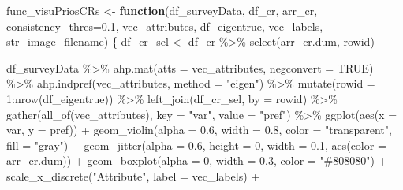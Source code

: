 \documentclass[
]{article}
\newenvironment{Shaded}{\begin{snugshade}}{\end{snugshade}}
\newcommand{\AttributeTok}[1]{\textcolor[rgb]{0.00,0.34,0.68}{#1}}
\newcommand{\ConstantTok}[1]{\textcolor[rgb]{0.67,0.33,0.00}{#1}}
\newcommand{\ControlFlowTok}[1]{\textcolor[rgb]{0.12,0.11,0.11}{\textbf{#1}}}
\newcommand{\DecValTok}[1]{\textcolor[rgb]{0.69,0.50,0.00}{#1}}
\newcommand{\FloatTok}[1]{\textcolor[rgb]{0.69,0.50,0.00}{#1}}
\newcommand{\FunctionTok}[1]{\textcolor[rgb]{0.39,0.29,0.61}{#1}}
\newcommand{\NormalTok}[1]{\textcolor[rgb]{0.12,0.11,0.11}{#1}}
\newcommand{\OtherTok}[1]{\textcolor[rgb]{0.00,0.43,0.16}{#1}}
\newcommand{\SpecialCharTok}[1]{\textcolor[rgb]{0.24,0.68,0.91}{#1}}
\newcommand{\StringTok}[1]{\textcolor[rgb]{0.75,0.01,0.01}{#1}}
\begin{document}
\begin{Shaded}
\begin{Highlighting}[]
\NormalTok{func\_visuPriosCRs }\OtherTok{\textless{}{-}} \ControlFlowTok{function}\NormalTok{(df\_surveyData, df\_cr, arr\_cr, }\AttributeTok{consistency\_thres=}\FloatTok{0.1}\NormalTok{, vec\_attributes, df\_eigentrue, vec\_labels, str\_image\_filename) \{}
\NormalTok{  df\_cr\_sel }\OtherTok{\textless{}{-}}\NormalTok{ df\_cr }\SpecialCharTok{\%\textgreater{}\%}
    \FunctionTok{select}\NormalTok{(arr\_cr.dum, rowid)}

\NormalTok{  df\_surveyData }\SpecialCharTok{\%\textgreater{}\%}
  \FunctionTok{ahp.mat}\NormalTok{(}\AttributeTok{atts =}\NormalTok{ vec\_attributes, }\AttributeTok{negconvert =} \ConstantTok{TRUE}\NormalTok{) }\SpecialCharTok{\%\textgreater{}\%} 
  \FunctionTok{ahp.indpref}\NormalTok{(vec\_attributes, }\AttributeTok{method =} \StringTok{"eigen"}\NormalTok{) }\SpecialCharTok{\%\textgreater{}\%} 
  \FunctionTok{mutate}\NormalTok{(}\AttributeTok{rowid =} \DecValTok{1}\SpecialCharTok{:}\FunctionTok{nrow}\NormalTok{(df\_eigentrue)) }\SpecialCharTok{\%\textgreater{}\%}
  \FunctionTok{left\_join}\NormalTok{(df\_cr\_sel, }\AttributeTok{by =} \StringTok{\textquotesingle{}rowid\textquotesingle{}}\NormalTok{) }\SpecialCharTok{\%\textgreater{}\%}
  \FunctionTok{gather}\NormalTok{(}\FunctionTok{all\_of}\NormalTok{(vec\_attributes), }\AttributeTok{key =} \StringTok{"var"}\NormalTok{, }\AttributeTok{value =} \StringTok{"pref"}\NormalTok{) }\SpecialCharTok{\%\textgreater{}\%}
  \FunctionTok{ggplot}\NormalTok{(}\FunctionTok{aes}\NormalTok{(}\AttributeTok{x =}\NormalTok{ var, }\AttributeTok{y =}\NormalTok{ pref)) }\SpecialCharTok{+} 
  \FunctionTok{geom\_violin}\NormalTok{(}\AttributeTok{alpha =} \FloatTok{0.6}\NormalTok{, }\AttributeTok{width =} \FloatTok{0.8}\NormalTok{, }\AttributeTok{color =} \StringTok{"transparent"}\NormalTok{, }\AttributeTok{fill =} \StringTok{"gray"}\NormalTok{) }\SpecialCharTok{+}
  \FunctionTok{geom\_jitter}\NormalTok{(}\AttributeTok{alpha =} \FloatTok{0.6}\NormalTok{, }\AttributeTok{height =} \DecValTok{0}\NormalTok{, }\AttributeTok{width =} \FloatTok{0.1}\NormalTok{, }\FunctionTok{aes}\NormalTok{(}\AttributeTok{color =}\NormalTok{ arr\_cr.dum)) }\SpecialCharTok{+}
  \FunctionTok{geom\_boxplot}\NormalTok{(}\AttributeTok{alpha =} \DecValTok{0}\NormalTok{, }\AttributeTok{width =} \FloatTok{0.3}\NormalTok{, }\AttributeTok{color =} \StringTok{"\#808080"}\NormalTok{) }\SpecialCharTok{+}
  \FunctionTok{scale\_x\_discrete}\NormalTok{(}\StringTok{"Attribute"}\NormalTok{, }\AttributeTok{label =}\NormalTok{ vec\_labels) }\SpecialCharTok{+}

\end{Highlighting}
\end{Shaded}
\end{document}
